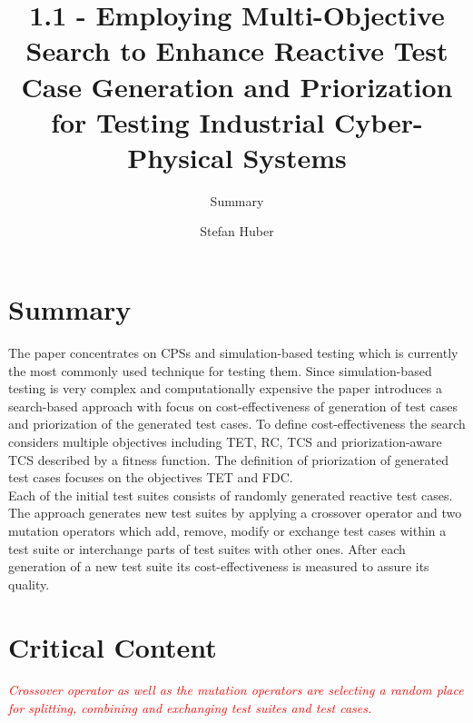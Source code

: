 \documentclass[oneside, notitlepage, twocolumn]{scrartcl}
\title{1.1 - Employing Multi-Objective Search to Enhance Reactive Test Case Generation and Priorization for Testing Industrial Cyber-Physical Systems}
\subtitle{Summary}
\author{Stefan Huber}
\newcommand{\draft}[1]{\textcolor{red}{\textit{#1}}}
\begin{document}
\maketitle

\section{Summary}
The paper concentrates on \ac{CPS}s and simulation-based testing which is currently the most commonly used technique for testing them.
Since simulation-based testing is very complex and computationally expensive the paper introduces a search-based approach with focus on cost-effectiveness of generation of test cases and priorization of the generated test cases.
To define cost-effectiveness the search considers multiple objectives including \ac{TET}, \ac{RC}, \ac{TCS} and priorization-aware \ac{TCS} described by a fitness function.
The definition of priorization of generated test cases focuses on the objectives \ac{TET} and \ac{FDC}.\\
Each of the initial test suites consists of randomly generated reactive test cases.
The approach generates new test suites  by applying a crossover operator and two mutation operators which add, remove, modify or exchange test cases within a test suite or interchange parts of test suites with other ones.
After each generation of a new test suite its cost-effectiveness is measured to assure its quality.

\section{Critical Content}
\draft{Crossover operator as well as the mutation operators are selecting a random place for splitting, combining and exchanging test suites and test cases.}\\
\end{document}
